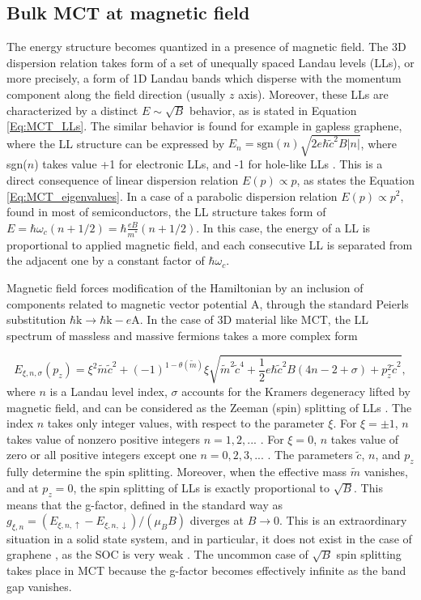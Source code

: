 \documentclass[titlepage,a4paper]{book}
\newcommand{\wciecie}{\quad\phantom{v}}
\begin{document}
\subsection{Bulk MCT at magnetic field}
\wciecie
The energy structure becomes quantized in a presence of magnetic field. The 3D dispersion relation takes form of a set of unequally spaced Landau levels (LLs), or more precisely, a form of 1D Landau bands which disperse with the momentum component along the field direction (usually $z$ axis). Moreover, these LLs are characterized by a distinct $E \sim \sqrt{B}$ behavior, as is stated in Equation \ref{Eq:MCT_LLs}. The similar behavior is found for example in gapless graphene, where the LL structure can be expressed by $E_n = \mathrm{sgn}(n) \sqrt{2e\hbar \tilde{c}^2B|n|}$, where sgn($n$) takes value +1 for electronic LLs, and -1 for hole-like LLs \cite{Jiang_MCT}. This is a direct consequence of linear dispersion relation $E(p) \propto p$, as states the Equation \ref{Eq:MCT_eigenvalues}. In a case of a parabolic dispersion relation $E(p) \propto p^2$, found in most of semiconductors, the LL structure takes form of $E = \hbar \omega_c(n + 1/2) = \hbar \frac{eB}{m^*}(n + 1/2)$. In this case, the energy of a LL is proportional to applied magnetic field, and each consecutive LL is separated from the adjacent one by a constant factor of $\hbar \omega_c$. 

Magnetic field forces modification of the Hamiltonian by an inclusion of components related to magnetic vector potential $\boldsymbol{\mathrm{A}}$, through the standard Peierls substitution $\hbar \boldsymbol{\mathrm{k}} \rightarrow \hbar\boldsymbol{\mathrm{k}} - e \boldsymbol{\mathrm{A}}$. In the case of 3D material like MCT, the LL spectrum of massless and massive fermions takes a more complex form

\begin{equation}
\label{Eq:MCT_LLs}
E_{\xi,n,\sigma }(p_z) = \xi^2 \tilde{m}\tilde{c}^2 + (-1)^{1-\theta (\tilde{m})} \xi \sqrt{\tilde{m}^2\tilde{c}^4 + \frac{1}{2}e\hbar\tilde{c}^2B (4n - 2 + \sigma) + p_z^2\tilde{c}^2},
\end{equation}
where $n$ is a Landau level index, $\sigma$ accounts for the Kramers degeneracy lifted by magnetic field, and can be considered as the Zeeman  (spin) splitting of LLs \cite{Teppe_MCT}. The index $n$ takes only integer values, with respect to the parameter $\xi$. For $\xi = \pm 1$, $n$ takes value of nonzero positive integers $n = 1,2,...$ . For $\xi = 0$, $n$ takes value of zero or all positive integers except one $n = 0,2,3,...$ . The parameters $\tilde{c}$, $n$, and $p_z$ fully determine the spin splitting. Moreover, when the effective mass $\tilde{m}$ vanishes, and at $p_z = 0$, the spin splitting of LLs is exactly proportional to $\sqrt{B}$. This means that the g-factor, defined in the standard way as $g_{\xi , n} = (E_{\xi , n , \uparrow} - E_{\xi , n , \downarrow})/(\mu_B B)$ diverges at $B \rightarrow 0$. This is an extraordinary situation in a solid state system, and in particular, it does not exist in the case of graphene \cite{Orlita_MCT}, as the SOC is very weak \cite{Min_Topology}. The uncommon case of $\sqrt{B}$ spin splitting takes place in MCT because the g-factor becomes effectively infinite as the band gap vanishes. 
\end{document}
